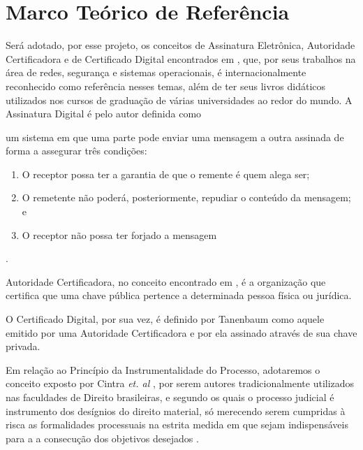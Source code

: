 \chapter{Marco Teórico de Referência}
  \label{marcoteorico}

  Será adotado, por esse projeto, os conceitos de Assinatura
  Eletrônica, Autoridade Certificadora e de Certificado Digital
  encontrados em , que, por seus trabalhos na área
  de redes, segurança e sistemas operacionais, é
  internacionalmente reconhecido como referência nesses temas,
  além de ter seus livros didáticos utilizados nos cursos de
  graduação de várias universidades ao redor do mundo. A
  Assinatura Digital é pelo autor definida como

  \begin{citacao}um sistema em que uma parte pode enviar uma
  mensagem a outra assinada de forma a assegurar três condições:
  \begin{enumerate} \item O receptor possa ter a garantia de que
  o remente é quem alega ser; \item O remetente não poderá,
  posteriormente, repudiar o conteúdo da mensagem; e \item O
  receptor não possa ter forjado a mensagem\end {enumerate}
  \cite{ComputerNetworks}\end{citacao}.\par

  Autoridade Certificadora, no conceito encontrado em
  \cite{ComputerNetworks}, é a organização que certifica que
  uma chave pública pertence a determinada pessoa física ou
  jurídica.\par

  O Certificado Digital, por sua vez, é definido por Tanenbaum
  \nocite{ComputerNetworks} como aquele emitido por uma
  Autoridade Certificadora e por ela assinado através de sua
  chave privada.\par

  Em relação ao Princípio da Instrumentalidade do Processo,
  adotaremos o conceito exposto por Cintra \emph{et. al}
  \nocite{TeoriaGeralDoProcesso}, por serem autores tradicionalmente
  utilizados nas faculdades de Direito brasileiras, e segundo os
  quais o processo judicial é instrumento dos desígnios do
  direito material, só merecendo serem cumpridas à risca as
  formalidades processuais na estrita medida em que sejam
  indispensáveis para a a consecução dos objetivos desejados
  \cite[p. 48]{TeoriaGeralDoProcesso}.

